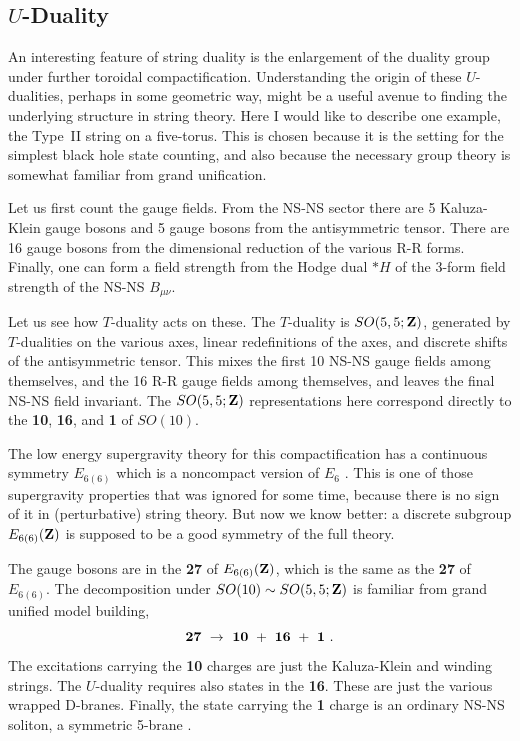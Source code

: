 \documentclass[12pt]{article}
\def\be{\begin{equation}}
\def\ee{\end{equation}}
\def\Z{{\bf Z}}
\begin{document}
\subsection{$U$-Duality}

An interesting feature of string duality is the enlargement of the duality
group under further toroidal compactification.  Understanding the origin of
these $U$-dualities, perhaps in some geometric way, might be a useful avenue
to finding the underlying structure in string theory.  Here I would like to
describe one example, the Type~II string on a five-torus.  This is chosen
because it is the setting for the simplest black hole state counting, and
also because the necessary group theory is somewhat familiar from grand
unification.

Let us first count the gauge fields.  From the NS-NS sector there are 5
Kaluza-Klein gauge bosons and 5 gauge bosons from the antisymmetric tensor. 
There are 16 gauge bosons from the dimensional reduction of the various R-R
forms.  Finally, one can form a field strength from the Hodge dual $*H$ of
the 3-form field strength of the NS-NS $B_{\mu\nu}$.

Let us see how $T$-duality acts on these.  The $T$-duality is $SO(5,5;\Z)$,
generated by $T$-dualities on the various axes, linear redefinitions of the
axes, and discrete shifts of the antisymmetric tensor.  This mixes the first
10 NS-NS gauge fields among themselves, and the 16 R-R gauge fields among
themselves, and leaves the final NS-NS field invariant.
The $SO(5,5;\Z)$ representations here correspond directly to the {\bf 10},
{\bf 16}, and {\bf 1} of $SO(10)$.

The low energy supergravity theory for this compactification has a
continuous symmetry $E_{6(6)}$ which is a noncompact version of
$E_6$ \cite{julia}.  This is one of those supergravity properties that was
ignored for some time, because there is no sign of it in (perturbative)
string theory. But now we know better: \cite{hullt} a discrete subgroup
$E_{6(6)}(\Z)$ is supposed to be a good symmetry of the full theory.

The gauge bosons are in the {\bf 27} of $E_{6(6)}(\Z)$, which is the same as
the {\bf 27} of $E_{6(6)}$.  The decomposition under $SO(10)
\sim SO(5,5;\Z)$ is familiar from grand unified model building,
\be
{\bf 27}\ \to\ {\bf 10}\ +\ {\bf 16}\ +\ {\bf 1}\ .
\ee
The excitations carrying the {\bf 10} charges are just the Kaluza-Klein and
winding strings.  The $U$-duality requires also states in the {\bf 16}.
These are just the various wrapped D-branes.  Finally, the state
carrying the {\bf 1} charge is an ordinary NS-NS soliton, a symmetric
5-brane \cite{chs}.
\end{document}

